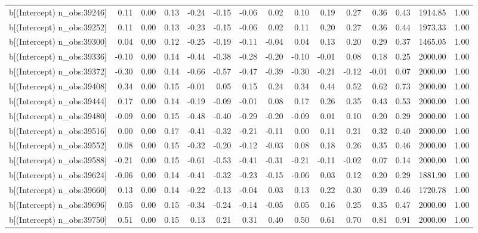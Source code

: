 \begin{table}[ht]
\begin{tabular}{rrrrrrrrrrrrrrr}
  b[(Intercept) n\_obs:39246] & 0.11 & 0.00 & 0.13 & -0.24 & -0.15 & -0.06 & 0.02 & 0.10 & 0.19 & 0.27 & 0.36 & 0.43 & 1914.85 & 1.00 \\ 
  b[(Intercept) n\_obs:39252] & 0.11 & 0.00 & 0.13 & -0.23 & -0.15 & -0.06 & 0.02 & 0.11 & 0.20 & 0.27 & 0.36 & 0.44 & 1973.33 & 1.00 \\ 
  b[(Intercept) n\_obs:39300] & 0.04 & 0.00 & 0.12 & -0.25 & -0.19 & -0.11 & -0.04 & 0.04 & 0.13 & 0.20 & 0.29 & 0.37 & 1465.05 & 1.00 \\ 
  b[(Intercept) n\_obs:39336] & -0.10 & 0.00 & 0.14 & -0.44 & -0.38 & -0.28 & -0.20 & -0.10 & -0.01 & 0.08 & 0.18 & 0.25 & 2000.00 & 1.00 \\ 
  b[(Intercept) n\_obs:39372] & -0.30 & 0.00 & 0.14 & -0.66 & -0.57 & -0.47 & -0.39 & -0.30 & -0.21 & -0.12 & -0.01 & 0.07 & 2000.00 & 1.00 \\ 
  b[(Intercept) n\_obs:39408] & 0.34 & 0.00 & 0.15 & -0.01 & 0.05 & 0.15 & 0.24 & 0.34 & 0.44 & 0.52 & 0.62 & 0.73 & 2000.00 & 1.00 \\ 
  b[(Intercept) n\_obs:39444] & 0.17 & 0.00 & 0.14 & -0.19 & -0.09 & -0.01 & 0.08 & 0.17 & 0.26 & 0.35 & 0.43 & 0.53 & 2000.00 & 1.00 \\ 
  b[(Intercept) n\_obs:39480] & -0.09 & 0.00 & 0.15 & -0.48 & -0.40 & -0.29 & -0.20 & -0.09 & 0.01 & 0.10 & 0.20 & 0.29 & 2000.00 & 1.00 \\ 
  b[(Intercept) n\_obs:39516] & 0.00 & 0.00 & 0.17 & -0.41 & -0.32 & -0.21 & -0.11 & 0.00 & 0.11 & 0.21 & 0.32 & 0.40 & 2000.00 & 1.00 \\ 
  b[(Intercept) n\_obs:39552] & 0.08 & 0.00 & 0.15 & -0.32 & -0.20 & -0.12 & -0.03 & 0.08 & 0.18 & 0.26 & 0.35 & 0.46 & 2000.00 & 1.00 \\ 
  b[(Intercept) n\_obs:39588] & -0.21 & 0.00 & 0.15 & -0.61 & -0.53 & -0.41 & -0.31 & -0.21 & -0.11 & -0.02 & 0.07 & 0.14 & 2000.00 & 1.00 \\ 
  b[(Intercept) n\_obs:39624] & -0.06 & 0.00 & 0.14 & -0.41 & -0.32 & -0.23 & -0.15 & -0.06 & 0.03 & 0.12 & 0.20 & 0.29 & 1881.90 & 1.00 \\ 
  b[(Intercept) n\_obs:39660] & 0.13 & 0.00 & 0.14 & -0.22 & -0.13 & -0.04 & 0.03 & 0.13 & 0.22 & 0.30 & 0.39 & 0.46 & 1720.78 & 1.00 \\ 
  b[(Intercept) n\_obs:39696] & 0.05 & 0.00 & 0.15 & -0.34 & -0.24 & -0.14 & -0.05 & 0.05 & 0.16 & 0.25 & 0.35 & 0.47 & 2000.00 & 1.00 \\ 
  b[(Intercept) n\_obs:39750] & 0.51 & 0.00 & 0.15 & 0.13 & 0.21 & 0.31 & 0.40 & 0.50 & 0.61 & 0.70 & 0.81 & 0.91 & 2000.00 & 1.00 \\ 

\end{tabular}
\end{table}
